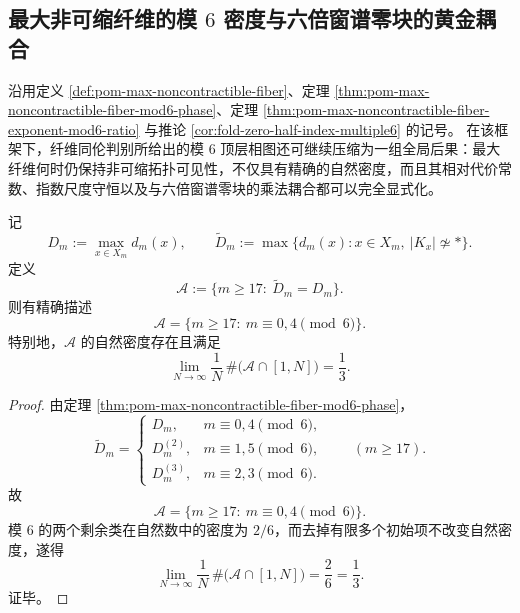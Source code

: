 \subsection{最大非可缩纤维的模 \texorpdfstring{$6$}{6} 密度与六倍窗谱零块的黄金耦合}\label{subsec:conclusion-max-noncontractible-fiber-zero-block-golden-coupling}
沿用定义 \ref{def:pom-max-noncontractible-fiber}、定理 \ref{thm:pom-max-noncontractible-fiber-mod6-phase}、定理 \ref{thm:pom-max-noncontractible-fiber-exponent-mod6-ratio} 与推论 \ref{cor:fold-zero-half-index-multiple6} 的记号。
在该框架下，纤维同伦判别所给出的模 \(6\) 顶层相图还可继续压缩为一组全局后果：最大纤维何时仍保持非可缩拓扑可见性，不仅具有精确的自然密度，而且其相对代价常数、指数尺度守恒以及与六倍窗谱零块的乘法耦合都可以完全显式化。

\begin{theorem}[最大纤维同伦可见性的自然密度]\label{thm:conclusion-maxfiber-homotopy-visibility-density}
记
\[
D_m:=\max_{x\in X_m}d_m(x),
\qquad
\widetilde D_m:=\max\{d_m(x):x\in X_m,\ |K_x|\not\simeq *\}.
\]
定义
\[
\mathcal A:=\{m\ge 17:\ \widetilde D_m=D_m\}.
\]
则有精确描述
\[
\boxed{\;
\mathcal A
=
\{m\ge 17:\ m\equiv 0,4\pmod 6\}.\;}
\]
特别地，\(\mathcal A\) 的自然密度存在且满足
\[
\boxed{\;
\lim_{N\to\infty}\frac1N\,\#\bigl(\mathcal A\cap [1,N]\bigr)=\frac13.\;}
\]
\end{theorem}
\begin{proof}
由定理 \ref{thm:pom-max-noncontractible-fiber-mod6-phase}，
\[
\widetilde D_m=
\begin{cases}
D_m,& m\equiv 0,4\pmod 6,\\[2pt]
D_m^{(2)},& m\equiv 1,5\pmod 6,\\[2pt]
D_m^{(3)},& m\equiv 2,3\pmod 6.
\end{cases}
\qquad (m\ge 17).
\]
故
\[
\mathcal A=\{m\ge 17:\ m\equiv 0,4\pmod 6\}.
\]
模 \(6\) 的两个剩余类在自然数中的密度为 \(2/6\)，而去掉有限多个初始项不改变自然密度，遂得
\[
\lim_{N\to\infty}\frac1N\,\#\bigl(\mathcal A\cap [1,N]\bigr)=\frac{2}{6}=\frac13.
\]
证毕。
\end{proof}


